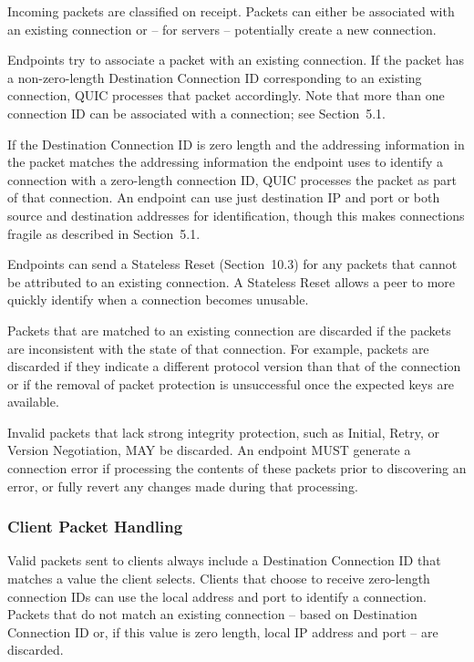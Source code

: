 \documentclass{article}
\begin{document}
Incoming packets are classified on receipt.  Packets can either be associated with an existing connection or -- for servers -- potentially create a new connection.

Endpoints try to associate a packet with an existing connection.  If the packet has a non-zero-length Destination Connection ID corresponding to an existing connection, QUIC processes that packet accordingly.  Note that more than one connection ID can be associated with a connection; see Section~5.1.

If the Destination Connection ID is zero length and the addressing information in the packet matches the addressing information the endpoint uses to identify a connection with a zero-length connection ID, QUIC processes the packet as part of that connection.  An endpoint can use just destination IP and port or both source and destination addresses for identification, though this makes connections fragile as described in Section~5.1.

Endpoints can send a Stateless Reset (Section~10.3) for any packets that cannot be attributed to an existing connection.  A Stateless Reset allows a peer to more quickly identify when a connection becomes unusable.

Packets that are matched to an existing connection are discarded if the packets are inconsistent with the state of that connection.  For example, packets are discarded if they indicate a different protocol version than that of the connection or if the removal of packet protection is unsuccessful once the expected keys are available.

Invalid packets that lack strong integrity protection, such as Initial, Retry, or Version Negotiation, MAY be discarded.  An endpoint MUST generate a connection error if processing the contents of these packets prior to discovering an error, or fully revert any changes made during that processing.

\subsubsection{Client Packet Handling}

Valid packets sent to clients always include a Destination Connection ID that matches a value the client selects.  Clients that choose to receive zero-length connection IDs can use the local address and port to identify a connection.  Packets that do not match an existing connection -- based on Destination Connection ID or, if this value is zero length, local IP address and port -- are discarded.
\end{document}
